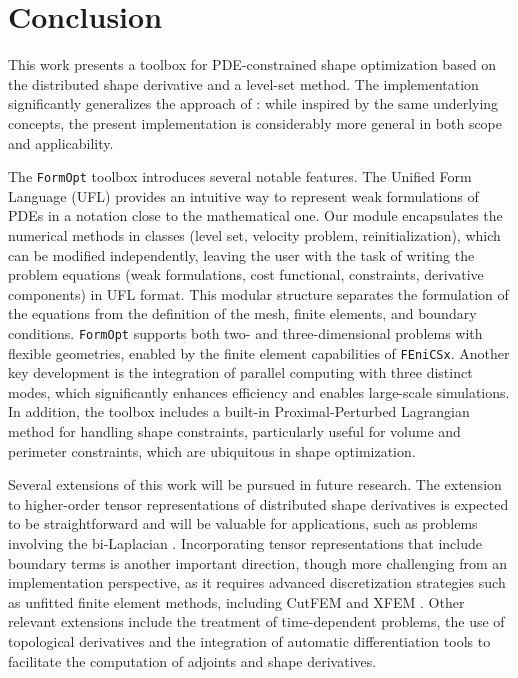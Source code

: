 \documentclass[iicol,pdflatex,sn-mathphys-ay]{sn-jnl}%
\theoremstyle{thmstyleone}%
\theoremstyle{thmstyletwo}%
\theoremstyle{thmstylethree}%
\begin{document}
\section{Conclusion}

This work presents a toolbox for PDE-constrained shape optimization
based on the distributed shape derivative and a level-set method.
The implementation significantly generalizes
the approach of \cite{MR3843884}:
while inspired by the same underlying concepts,
the present implementation is considerably
more general in both scope and applicability.

The \texttt{FormOpt} toolbox introduces several notable features.
The Unified Form Language (UFL) provides an intuitive way
to represent weak formulations of PDEs in a notation
close to the mathematical one. 
Our module encapsulates the numerical methods in classes
(level set, velocity problem, reinitialization),
which can be modified independently,
leaving the user with the task of writing the problem equations
(weak formulations, cost functional, constraints, derivative components)
in UFL format.
This modular structure separates the formulation of the equations
from the definition of the mesh, finite elements, and boundary conditions.
\texttt{FormOpt}  supports both two- and three-dimensional problems with
flexible geometries, enabled by the finite element capabilities
of \texttt{FEniCSx}. Another key development is the integration of
parallel computing with three distinct modes,
which significantly enhances efficiency and enables
large-scale simulations. In addition,
the toolbox includes a built-in Proximal-Perturbed Lagrangian method
for handling shape constraints, particularly useful for volume
and perimeter constraints, which are ubiquitous in shape optimization.

Several extensions of this work will be pursued in future research.
The extension to higher-order tensor representations of
distributed shape derivatives is expected to be straightforward
and will be valuable for applications, such as problems
involving the bi-Laplacian \citep{LL2024}.
Incorporating tensor representations that include boundary
terms is another important direction, though more challenging
from an implementation perspective, as it requires advanced
discretization strategies such as unfitted finite element methods,
including CutFEM \citep{MR3416285} and XFEM \citep{belytschko2001arbitrary}. 
Other relevant extensions include the treatment of
time-dependent problems, the use of topological derivatives
\citep{MR4916810,MR3013681} and the integration of automatic
differentiation tools
\citep{Allaire2024,BLAUTH2023101577,MR4233697,MR4034755,MR4244971}
to facilitate the computation of adjoints and shape derivatives.
\end{document}
